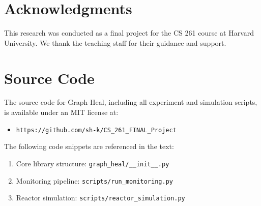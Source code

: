 \documentclass[11pt,conference]{IEEEtran}
\begin{document}
\section*{Acknowledgments}
This research was conducted as a final project for the CS 261 course at Harvard University. We thank the teaching staff for their guidance and support.




\appendix
\section*{Source Code}

The source code for Graph-Heal, including all experiment and simulation scripts, is available under an MIT license at:
\begin{itemize}
    \item \texttt{https://github.com/sh-k/CS\_261\_FINAL\_Project}
\end{itemize}

The following code snippets are referenced in the text:
\begin{enumerate}
    \item Core library structure: \texttt{graph\_heal/\_\_init\_\_.py}
    \item Monitoring pipeline: \texttt{scripts/run\_monitoring.py}
    \item Reactor simulation: \texttt{scripts/reactor\_simulation.py}
\end{enumerate}
\end{document}
